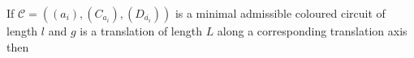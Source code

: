\documentclass[preview]{standalone}
\begin{document}
\begin{center}
If $\mathcal{C} = ((a_i), (C_{a_i}), (D_{\overline{a_i}}))$ is a minimal admissible coloured circuit of length $l$ and $g$ is a translation of length $L$ along a corresponding translation axis then
\end{center}
\end{document}
